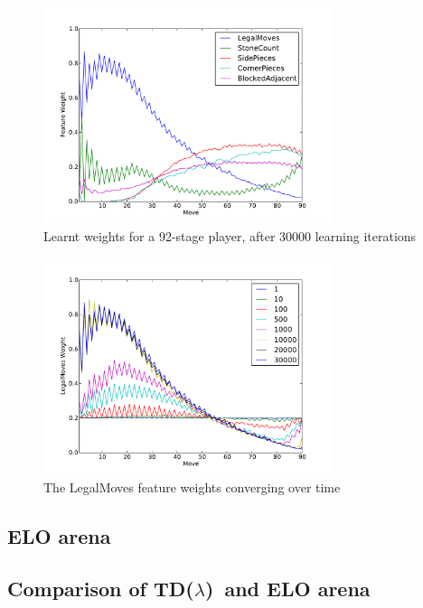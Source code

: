 \documentclass[11pt]{article}
\newcommand{\tdl}{TD($\lambda$)}
\begin{document}
\begin{figure}[htbp]
  \centering
  \includegraphics[trim=0cm 0cm 1.5cm 1cm, clip, width=0.75\textwidth]
    {../Graphs/finalweights.pdf}
  \caption{Learnt weights for a 92-stage player, after 30000 learning iterations}
  \label{WeightsOverTime92}
\end{figure}

\begin{figure}[htbp]
  \centering
  \includegraphics[trim=0cm 0cm 1.5cm 1cm, clip, width=0.75\textwidth]
    {../Graphs/legalmovesprogression.pdf}
  \caption{The LegalMoves feature weights converging over time}
  \label{LegalMovesConvergence}
\end{figure}

\clearpage

\subsection{ELO arena}
\label{sub:elo_arena}

\subsection{Comparison of \tdl\ and ELO arena}
\label{sub:comparing_learning}
\end{document}
